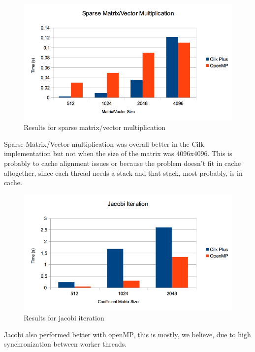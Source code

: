 \documentclass[a4paper,10pt,openright,openbib,twocolumn]{article}
\begin{document}
        \begin{figure}[htb]
            \centering
            \includegraphics[scale=0.35]{../pres/images/sparse.png}
            \caption{Results for sparse matrix/vector multiplication}
            \label{roofline}
        \end{figure}
        Sparse Matrix/Vector multiplication was overall better in the Cilk implementation but not when the size of the matrix was 4096x4096. This is probably to cache alignment issues or because the problem doesn't fit in cache altogether, since each thread needs a stack and that stack, most probably, is in cache. \\

        \begin{figure}[htb]
            \centering
            \includegraphics[scale=0.35]{../pres/images/jacobi.png}
            \caption{Results for jacobi iteration}
            \label{roofline}
        \end{figure}
        Jacobi also performed better with openMP, this is mostly, we believe, due to high synchronization between worker threads. \\
\end{document}
